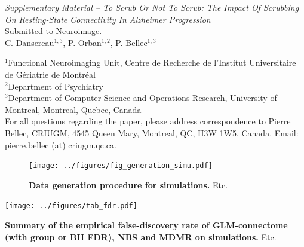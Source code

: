 \documentclass[authoryear,preprint,review]{elsarticle}
\begin{document}
\clearpage
\pagebreak
\renewcommand{\thefigure}{S\arabic{figure}}
\renewcommand{\thetable}{S\arabic{table}}
\setcounter{figure}{0}
\begin{center}
\emph{Supplementary Material {--} To Scrub Or Not To Scrub: The Impact Of Scrubbing On Resting-­State Connectivity In Alzheimer Progression}\\

\vspace{\baselineskip}Submitted to Neuroimage.\\

\vspace{\baselineskip}C. Dansereau$^{1,3}$,  P. Orban$^{1,2}$, P. Bellec$^{1,3}$\\
\end{center}
$^1$Functional Neuroimaging Unit, Centre de Recherche de l'Institut Universitaire de G\'eriatrie de Montr\'eal\\
$^2$Department of Psychiatry\\
$^3$Department of Computer Science and Operations Research, University of Montreal, Montreal, Quebec, Canada\\

For all questions regarding the paper, please address correspondence to Pierre Bellec, CRIUGM, 4545 Queen Mary, Montreal, QC, H3W 1W5, Canada. Email: pierre.bellec (at) criugm.qc.ca.\\


\pagebreak

\begin{figure}[!ht]
\begin{center}
\texttt{[image: ../figures/fig\_generation\_simu.pdf]}
\end{center}
\caption{
{\bf Data generation procedure for simulations.} {Etc.} 
}
\label{fig_generation_simu}
\end{figure}


\begin{table}[!ht]
\begin{center}
\texttt{[image: ../figures/tab\_fdr.pdf]}
\end{center}
\caption{
{\bf Summary of the empirical false-discovery rate of GLM-connectome (with group or BH FDR), NBS and MDMR on simulations.} {Etc.} 
}
\label{tab_fdr}
\end{table}
\end{document}
